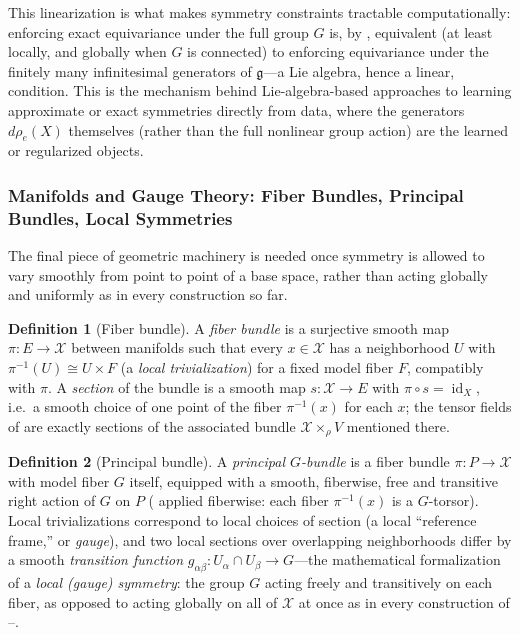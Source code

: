 \documentclass[11pt]{article}
\theoremstyle{plain}
\theoremstyle{definition}
\newtheorem{Definition}{Definition}[section]
\begin{document}
This linearization is what makes symmetry constraints tractable
computationally: enforcing exact equivariance under the full group $G$ is,
by , equivalent (at least
locally, and globally when $G$ is connected) to enforcing equivariance under
the finitely many infinitesimal generators of $\mathfrak{g}$---a Lie
algebra, hence a linear, condition. This is the mechanism behind
Lie-algebra-based approaches to learning approximate or exact symmetries
directly from data, where the generators $d\rho_e(X)$ themselves (rather
than the full nonlinear group action) are the learned or regularized
objects.

\subsubsection{Manifolds and Gauge Theory: Fiber Bundles, Principal Bundles, Local Symmetries}
\label{subsec:manifold-gauge-theory}

The final piece of geometric machinery is needed once symmetry is allowed to
vary smoothly from point to point of a base space, rather than acting
globally and uniformly as in every construction so far.

\begin{Definition}[Fiber bundle]
\label{def:fiber-bundle}
A \emph{fiber bundle} is a surjective smooth map $\pi : E \to \mathcal{X}$ between
manifolds such that every $x \in \mathcal{X}$ has a neighborhood $U$ with
$\pi^{-1}(U) \cong U \times F$ (a \emph{local trivialization}) for a fixed
model fiber $F$, compatibly with $\pi$. A \emph{section} of the bundle is a
smooth map $s : \mathcal{X} \to E$ with $\pi \circ s = \operatorname{id}_X$, i.e.\ a smooth
choice of one point of the fiber $\pi^{-1}(x)$ for each $x$; the tensor
fields of  are exactly sections of the
associated bundle $\mathcal{X} \times_\rho V$ mentioned there.
\end{Definition}

\begin{Definition}[Principal bundle]
\label{def:principal-bundle}
A \emph{principal $G$-bundle} is a fiber bundle $\pi : P \to \mathcal{X}$ with model
fiber $G$ itself, equipped with a smooth, fiberwise, free and transitive
right action of $G$ on $P$ ( applied
fiberwise: each fiber $\pi^{-1}(x)$ is a $G$-torsor). Local
trivializations correspond to local choices of section (a local ``reference
frame,'' or \emph{gauge}), and two local sections over overlapping
neighborhoods differ by a smooth \emph{transition function} $g_{\alpha\beta}
: U_\alpha \cap U_\beta \to G$---the mathematical formalization of a
\emph{local (gauge) symmetry}: the group $G$ acting freely and transitively
on each fiber, as opposed to acting globally on all of $\mathcal{X}$ at once as in
every construction of --.
\end{Definition}
\end{document}
